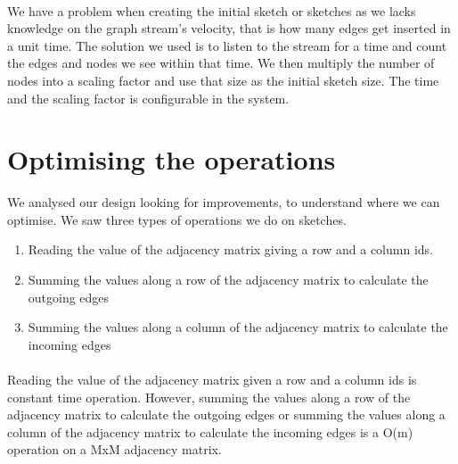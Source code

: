 \documentclass[12pt]{report}
\numberwithin{figure}{section}
\numberwithin{table}{section}
\begin{document}
\paragraph{}

We have a problem when creating the initial sketch or sketches as we lacks knowledge on the graph stream's velocity, that is how many edges get inserted in a unit time. The solution we used is to listen to the stream for a time and count the edges and nodes we see within that time. We then multiply the number of nodes into a scaling factor and use that size as the initial sketch size. The time and the scaling factor is configurable in the system.

\paragraph{}

\section{Optimising the operations}
We analysed our design looking for improvements, to understand where we can optimise. We saw three types of operations we do on sketches.

\begin{enumerate}
\item Reading the value of the adjacency matrix giving a row and a column ids.
\item Summing the values along a row of the adjacency matrix to calculate the outgoing edges 
\item Summing the values along a column of the adjacency matrix to calculate the incoming edges
\end{enumerate}


\paragraph{}

Reading the value of the adjacency matrix given a row and a column ids is constant time operation. However, summing the values along a row of the adjacency matrix to calculate the outgoing edges or summing the values along a column of the adjacency matrix to calculate the incoming edges is a O(m) operation on a MxM adjacency matrix.

\paragraph{}
\end{document}

